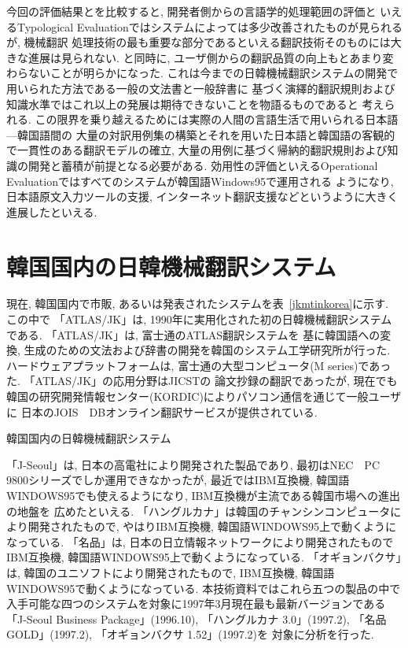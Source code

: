 今回の評価結果と\cite{choiandkim}を比較すると, 開発者側からの言語学的処理範囲の評価と
いえるTypological Evaluationではシステムによっては多少改善されたものが見られるが, 機械翻訳
処理技術の最も重要な部分であるといえる翻訳技術そのものには大きな進展は見られない. と同時に, 
ユーザ側からの翻訳品質の向上も\cite{choiandkim}とあまり変わらないことが明らかになった. 
これは今までの日韓機械翻訳システムの開発で用いられた方法である一般の文法書と一般辞書に
基づく演繹的翻訳規則および知識水準ではこれ以上の発展は期待できないことを物語るものであると
考えられる. この限界を乗り越えるためには実際の人間の言語生活で用いられる日本語—韓国語間の
大量の対訳用例集の構築とそれを用いた日本語と韓国語の客観的で一貫性のある翻訳モデルの確立, 
大量の用例に基づく帰納的翻訳規則および知識の開発と蓄積が前提となる必要がある. 
効用性の評価といえるOperational Evaluationではすべてのシステムが韓国語Windows95で運用される
ようになり, 日本語原文入力ツールの支援, インターネット翻訳支援などというように大きく進展したといえる. 

\section{韓国国内の日韓機械翻訳システム}
現在, 韓国国内で市販, あるいは発表されたシステムを表~\ref{jkmtinkorea}に示す. この中で  「ATLAS/JK」は, 
1990年に実用化された初の日韓機械翻訳システムである.  「ATLAS/JK」は, 富士通のATLAS翻訳システムを
基に韓国語への変換, 生成のための文法および辞書の開発を韓国のシステム工学研究所が行った. 
ハードウェアプラットフォームは, 富士通の大型コンピュータ(M series)であった.  「ATLAS/JK」の応用分野はJICSTの
論文抄録の翻訳であったが, 現在でも韓国の研究開発情報センター(KORDIC)によりパソコン通信を通じて一般ユーザに
日本のJOIS　DBオンライン翻訳サービスが提供されている. 


\begin{table}
\begin{center}
\caption{\label{jkmtinkorea} 韓国国内の日韓機械翻訳システム} 
\end{center}
\end{table}	


「J-Seoul」は, 日本の高電社により開発された製品であり, 最初はNEC　PC　9800シリーズでしか運用できなかったが, 
最近ではIBM互換機, 韓国語WINDOWS95でも使えるようになり, IBM互換機が主流である韓国市場への進出の地盤を
広めたといえる. 「ハングルカナ」は韓国のチャンシンコンピュータにより開発されたもので, やはりIBM互換機, 
韓国語WINDOWS95上で動くようになっている. 「名品」は, 日本の日立情報ネットワークにより開発されたもので
IBM互換機, 韓国語WINDOWS95上で動くようになっている. 「オギョンバクサ」は, 韓国のユニソフトにより開発されたもので, 
IBM互換機, 韓国語WINDOWS95で動くようになっている. 
本技術資料ではこれら五つの製品の中で入手可能な四つのシステムを対象に1997年3月現在最も最新バージョンである
「J-Seoul Business Package」(1996.10), 「ハングルカナ 3.0」(1997.2), 「名品GOLD」(1997.2), 「オギョンバクサ 1.52」(1997.2)を
対象に分析を行った. 

